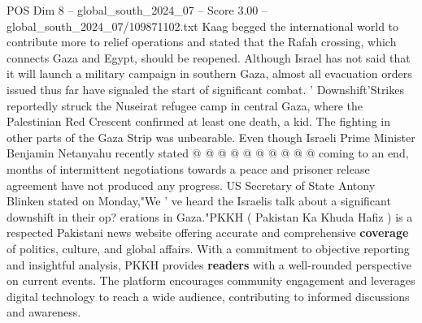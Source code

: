 \begin{textsample}{POS Dim 8 – global\_south\_2024\_07 – Score 3.00 – global\_south\_2024\_07/109871102.txt}
Kaag begged the international world to contribute more to relief operations and stated that the Rafah crossing, which connects Gaza and Egypt, should be reopened.
Although Israel has not said that it will launch a military campaign in southern Gaza, almost all evacuation orders issued thus far have signaled the start of significant combat. ' Downshift'Strikes reportedly struck the Nuseirat refugee camp in central Gaza, where the Palestinian Red Crescent confirmed at least one death, a kid.
The fighting in other parts of the Gaza Strip was unbearable.
Even though Israeli Prime Minister Benjamin Netanyahu recently stated @ @ @ @ @ @ @ @ @ @ coming to an end, months of intermittent negotiations towards a peace and prisoner release agreement have not produced any progress.
US Secretary of State Antony Blinken stated on Monday,"We ' ve heard the Israelis talk about a significant downshift in their op? erations in Gaza."PKKH ( Pakistan Ka Khuda Hafiz ) is a respected Pakistani news website offering accurate and comprehensive \textbf{coverage} of politics, culture, and global affairs.
With a commitment to objective reporting and insightful analysis, PKKH provides \textbf{readers} with a well-rounded perspective on current events.
The platform encourages community engagement and leverages digital technology to reach a wide audience, contributing to informed discussions and awareness.

\end{textsample}
